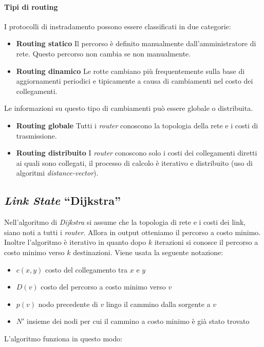     \paragraph{Tipi di routing}
        I protocolli di instradamento possono essere classificati in due categorie: \begin{itemize}
            \item \textbf{Routing statico} Il percorso è definito manualmente dall'amministratore di rete. Questo percorso non cambia se non manualmente.
            \item \textbf{Routing dinamico} Le rotte cambiano più frequentemente sulla base di aggiornamenti periodici e tipicamente a causa di cambiamenti nel costo dei collegamenti.
        \end{itemize}
        Le informazioni su questo tipo di cambiamenti può essere globale o distribuita.
        \begin{itemize}
            \item \textbf{Routing globale} Tutti i \textit{router} conoscono la topologia della rete e i costi di trasmissione.
            \item \textbf{Routing distribuito} I \textit{router} conoscono solo i costi dei collegamenti diretti ai quali sono collegati, il processo di calcolo è iterativo e distribuito (uso di algoritmi \textit{distance-vector}).
        \end{itemize}
    \subsection{\textit{Link State} ``Dijkstra''}
        Nell'algoritmo di \textit{Dijkstra} si assume che la topologia di rete e i costi dei link, siano noti a tutti i \textit{router}. Allora in output otteniamo il percorso a costo minimo. Inoltre l'algoritmo è iterativo in quanto dopo $k$ iterazioni si conosce il percorso a costo minimo verso $k$ destinazioni.\newline
        Viene usata la seguente notazione: \begin{itemize}
            \item $c(x,y)$ costo del collegamento tra $x$ e $y$
            \item $D(v)$ costo del percorso a costo minimo verso $v$
            \item $p(v)$ nodo precedente di $v$ lingo il cammino dalla sorgente a $v$
            \item $N'$ insieme dei nodi per cui il cammino a costo minimo è già stato trovato
        \end{itemize}\newpage
        L'algoritmo funziona in questo modo:

